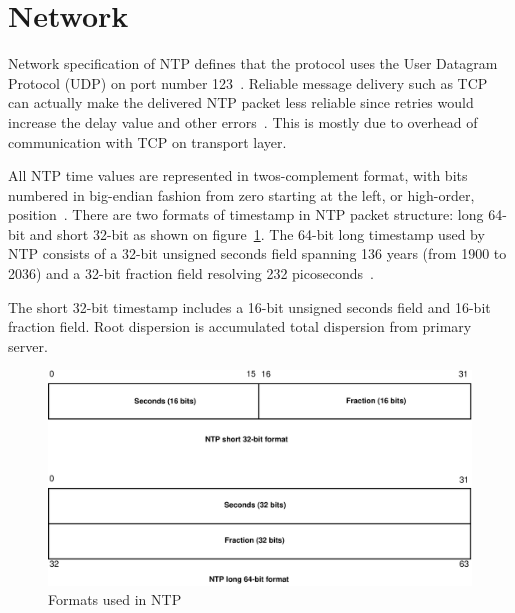 
\section{Network}\label{sec:ntp-network}
Network specification of NTP defines that
the protocol uses the User Datagram Protocol (UDP) on port number 123~\cite{ianna-ports,rfc5905}.
Reliable message delivery such as TCP can actually make the delivered NTP packet less reliable since retries
would increase the delay value and other errors~\cite{rfc5905}.
This is mostly due to overhead of communication with TCP on transport layer.

All NTP time values are represented in twos-complement format, with
bits numbered in big-endian fashion from zero starting at the left, or high-order, position~\cite{rfc5905}. 
There are two formats of timestamp in NTP packet structure:
long 64-bit and short 32-bit as shown on figure~\ref{fig:ntp-timestamps}.
The 64-bit long timestamp used by NTP consists of a 32-bit unsigned seconds
field spanning 136 years (from 1900 to 2036) and a 32-bit fraction field resolving 232
picoseconds~\cite{rfc5905}.


The short 32-bit timestamp includes a 16-bit unsigned seconds field
and 16-bit fraction field.
Root dispersion is accumulated total dispersion from primary server.

\begin{figure}
	\centering
	\includegraphics[width=13cm,keepaspectratio]{fig/ntp-timestamps.pdf}
	\caption{Formats used in NTP}
	\label{fig:ntp-timestamps}
	\bigskip
\end{figure}


